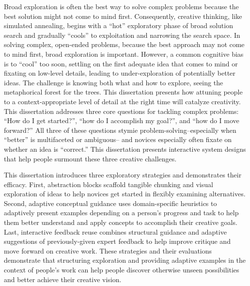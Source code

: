 Broad exploration is often the best way to solve complex problems because the best solution might not come to mind first. Consequently, creative thinking, like simulated annealing, begins with a “hot” exploratory phase of broad solution search and gradually “cools” to exploitation and narrowing the search space. In solving complex, open-ended problems, because the best approach may not come to mind first, broad exploration is important. However, a common cognitive bias is to ``cool'' too soon, settling on the first adequate idea that comes to mind or fixating on low-level details, leading to under-exploration of potentially better ideas. The challenge is knowing both what and how to explore, seeing the metaphorical forest for the trees. This dissertation presents how attuning people to a context-appropriate level of detail at the right time will catalyze creativity. This dissertation addresses three core questions for tackling complex problems: ``How do I get started?'', ``how do I accomplish my goal?'', and ``how do I move forward?'' All three of these questions stymie problem-solving--especially when ``better'' is multifaceted or ambiguous-- and novices especially often fixate on whether an idea is ``correct.'' This dissertation presents interactive system designs that help people surmount these three creative challenges.

This dissertation introduces three exploratory strategies and demonstrates their efficacy. First, abstraction blocks scaffold tangible chunking and visual exploration of ideas to help novices get started in flexibly examining alternatives. Second, adaptive conceptual guidance uses domain-specific heuristics to adaptively present examples depending on a person’s progress and task to help them better understand and apply concepts to accomplish their creative goals. Last, interactive feedback reuse combines structural guidance and adaptive suggestions of previously-given expert feedback to help improve critique and move forward on creative work. These strategies and their evaluations demonstrate that structuring exploration and providing adaptive examples in the context of people’s work can help people discover otherwise unseen possibilities and better achieve their creative vision.


